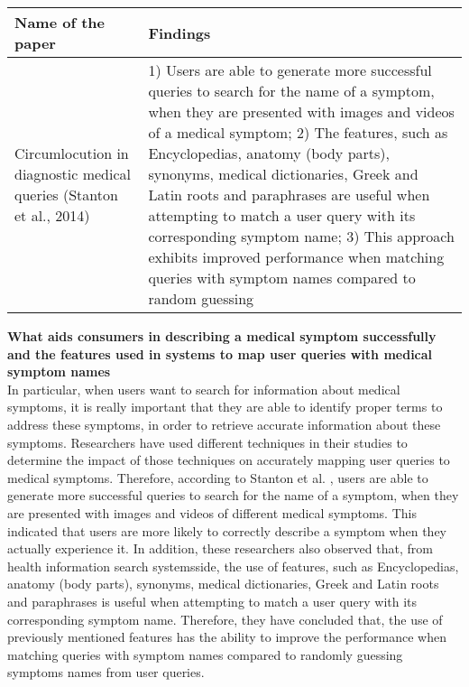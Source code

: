 \documentclass[]{article}
\begin{document}
\begin{center}
	\begin{longtable}{||p{4cm} | p{10cm}||} 
		\hline
		\textbf{Name of the paper} & \textbf{Findings}\\ [0.5ex] 
		\hline\hline
		Circumlocution in diagnostic medical queries (Stanton et al., 2014) & 1) Users are able to generate more successful queries to search for the name of a symptom, when they are presented with images and videos of a medical symptom; 2) The features, such as Encyclopedias, anatomy (body parts), synonyms, medical dictionaries, Greek and Latin roots and paraphrases are useful when attempting to match a user query with its corresponding symptom name; 3) This approach exhibits improved performance when matching queries with symptom names compared to random guessing\\		
		\hline
	\end{longtable}	
	
\end{center} 

\textbf{What aids consumers in describing a medical symptom successfully and the features used in systems to map user queries with medical symptom names}\\  


In particular, when users want to search for information about medical symptoms, it is really important that they are able to identify proper terms to address these symptoms, in order to retrieve accurate information about these symptoms. Researchers have used different techniques in their studies to determine the impact of those techniques on accurately mapping user queries to medical symptoms. Therefore, according to Stanton et al. \cite{stanton2014circumlocution}, users are able to generate more successful queries to search for the name of a symptom, when they are presented with images and videos of different medical symptoms. This indicated that users are more likely to correctly describe a symptom when they actually experience it. In addition, these researchers also observed that, from health information search systems\textquotesingle side, the use of features, such as Encyclopedias, anatomy (body parts), synonyms, medical dictionaries, Greek and Latin roots and paraphrases is useful when attempting to match a user query with its corresponding symptom name. Therefore, they have concluded that, the use of previously mentioned features has the ability to improve the performance when matching queries with symptom names compared to randomly guessing symptoms names from user queries. \\	
\end{document}
